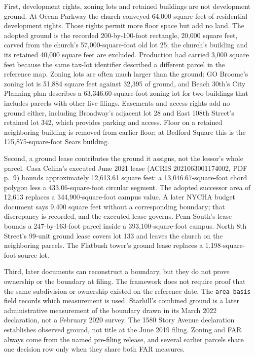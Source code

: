First, development rights, zoning lots and retained buildings are not
development ground. At Ocean Parkway the church conveyed 64,000 square feet of
residential development rights. Those rights permit more floor space but add
no land. The adopted ground is the recorded 200-by-100-foot rectangle, 20,000
square feet, carved from the church's 57,000-square-foot old lot 25; the
church's building and its retained 40,000 square feet are excluded. Production
had carried 3,000 square feet because the same tax-lot identifier described a
different parcel in the reference map. Zoning lots are often much larger than
the ground: GO Broome's zoning lot is 51,884 square feet against 32,395 of
ground, and Beach 30th's City Planning plan describes a
63,346.60-square-foot zoning lot for two buildings that includes parcels with
other live filings. Easements and
access rights add no ground either, including Broadway's adjacent lot 28 and
East 108th Street's retained lot 342, which provides parking and access. Floor
on a retained neighboring building is removed from earlier floor; at Bedford
Square this is the 175,875-square-foot Sears building.

Second, a ground lease contributes the ground it assigns, not the lessor's
whole parcel. Casa Celina's executed June 2021 lease (ACRIS 2021063001174002,
PDF p.~9) bounds approximately 12,613.61 square feet: a
13,046.67-square-foot chord polygon less a 433.06-square-foot circular
segment. The adopted successor area of 12,613 replaces a 344,900-square-foot
campus value. A later NYCHA budget document says 9,400 square feet without a
corresponding boundary; that discrepancy is recorded, and the executed lease
governs. Penn South's lease bounds a 247-by-163-foot parcel inside a
393,100-square-foot campus. North 8th Street's 99-unit ground lease covers lot
133 and leaves the church on the neighboring parcels. The Flatbush tower's
ground lease replaces a 1,198-square-foot source lot.

Third, later documents can reconstruct a boundary, but they do not prove
ownership or the boundary at filing. The framework does not require proof that
the same subdivision or ownership existed on the reference date. The
\texttt{area\_basis} field records which measurement is used. Starhill's
combined ground is a later administrative measurement of the boundary drawn in
its March 2022 declaration, not a February 2020 survey. The 1580 Story Avenue
declaration establishes observed ground, not title at the June 2019 filing.
Zoning and FAR always come from the named pre-filing release, and several
earlier parcels share one decision row only when they share both FAR measures.

